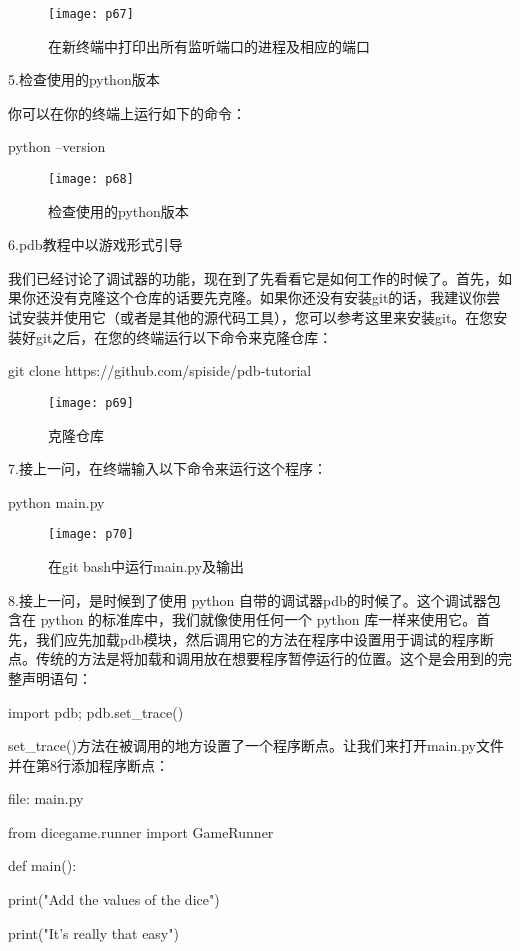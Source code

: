 \documentclass[a4paper ,12pt]{article}
\begin{document}
	\begin{figure}[h]
		\centering
		\texttt{[image: p67]}
		\caption{在新终端中打印出所有监听端口的进程及相应的端口}
	\end{figure}
	
	5.检查使用的python版本
	
	你可以在你的终端上运行如下的命令：
	
	python --version
	
	\begin{figure}[h]
		\centering
		\texttt{[image: p68]}
		\caption{检查使用的python版本}
	\end{figure}
	
	6.pdb教程中以游戏形式引导
	
	我们已经讨论了调试器的功能，现在到了先看看它是如何工作的时候了。首先，如果你还没有克隆这个仓库的话要先克隆。如果你还没有安装git的话，我建议你尝试安装并使用它（或者是其他的源代码工具），您可以参考这里来安装git。在您安装好git之后，在您的终端运行以下命令来克隆仓库：
	
	git clone https://github.com/spiside/pdb-tutorial
	\begin{figure}[h]
		\centering
		\texttt{[image: p69]}
		\caption{克隆仓库}
	\end{figure}
	
	7.接上一问，在终端输入以下命令来运行这个程序：
	
	python main.py
	\begin{figure}[h]
		\centering
		\texttt{[image: p70]}
		\caption{在git bash中运行main.py及输出}
	\end{figure}
	
	8.接上一问，是时候到了使用 python 自带的调试器pdb的时候了。这个调试器包含在 python 的标准库中，我们就像使用任何一个 python 库一样来使用它。首先，我们应先加载pdb模块，然后调用它的方法在程序中设置用于调试的程序断点。传统的方法是将加载和调用放在想要程序暂停运行的位置。这个是会用到的完整声明语句：
	
	import pdb; pdb.set\_trace()
	
	set\_trace()方法在被调用的地方设置了一个程序断点。让我们来打开main.py文件并在第8行添加程序断点：
	
	file: main.py
	
	from dicegame.runner import GameRunner
	
	
	def main():
	
	print("Add the values of the dice")
	
	print("It's really that easy")
	
\end{document}
